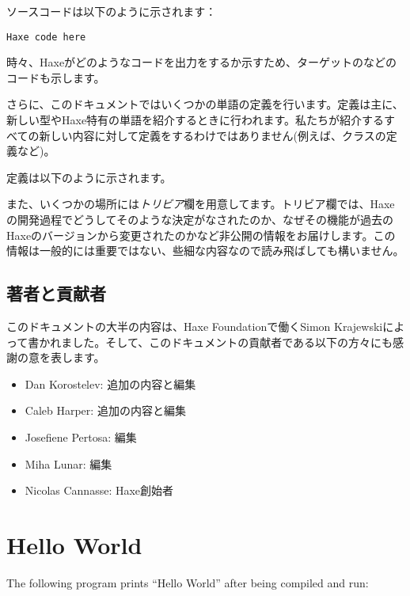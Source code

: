 ソースコードは以下のように示されます：

\begin{lstlisting}
Haxe code here
\end{lstlisting}

時々、Haxeがどのようなコードを出力をするか示すため、ターゲットのなどのコードも示します。

さらに、このドキュメントではいくつかの単語の定義を行います。定義は主に、新しい型やHaxe特有の単語を紹介するときに行われます。私たちが紹介するすべての新しい内容に対して定義をするわけではありません(例えば、クラスの定義など)。

定義は以下のように示されます。


また、いくつかの場所には\emph{トリビア}欄を用意してます。トリビア欄では、Haxeの開発過程でどうしてそのような決定がなされたのか、なぜその機能が過去のHaxeのバージョンから変更されたのかなど非公開の情報をお届けします。この情報は一般的には重要ではない、些細な内容なので読み飛ばしても構いません。


\subsection{著者と貢献者}
\label{introduction-authors-and-contributions}

このドキュメントの大半の内容は、Haxe Foundationで働くSimon Krajewskiによって書かれました。そして、このドキュメントの貢献者である以下の方々にも感謝の意を表します。

\begin{itemize}
	\item Dan Korostelev: 追加の内容と編集
	\item Caleb Harper: 追加の内容と編集
	\item Josefiene Pertosa: 編集
	\item Miha Lunar: 編集
	\item Nicolas Cannasse: Haxe創始者
\end{itemize}



\section{Hello World}
\label{introduction-hello-world}

The following program prints ``Hello World'' after being compiled and run:

